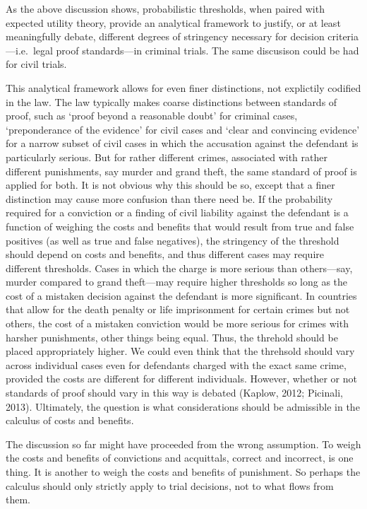 \documentclass[10pt,dvipsnames,enabledeprecatedfontcommands]{scrartcl}
\begin{document}
As the above discussion shows, probabilistic thresholds, when paired
with expected utility theory, provide an analytical framework to
justify, or at least meaningfully debate, different degrees of
stringency necessary for decision criteria---i.e.~legal proof
standards---in criminal trials. The same discusison could be had for
civil trials.

This analytical framework allows for even finer distinctions, not
explictily codified in the law. The law typically makes coarse
distinctions between standards of proof, such as `proof beyond a
reasonable doubt' for criminal cases, `preponderance of the evidence'
for civil cases and `clear and convincing evidence' for a narrow subset
of civil cases in which the accusation against the defendant is
particularly serious. But for rather different crimes, associated with
rather different punishments, say murder and grand theft, the same
standard of proof is applied for both. It is not obvious why this should
be so, except that a finer distinction may cause more confusion than
there need be. If the probability required for a conviction or a finding
of civil liability against the defendant is a function of weighing the
costs and benefits that would result from true and false positives (as
well as true and false negatives), the stringency of the threshold
should depend on costs and benefits, and thus different cases may
require different thresholds. Cases in which the charge is more serious
than others---say, murder compared to grand theft---may require higher
thresholds so long as the cost of a mistaken decision against the
defendant is more significant. In countries that allow for the death
penalty or life imprisonment for certain crimes but not others, the cost
of a mistaken conviction would be more serious for crimes with harsher
punishments, other things being equal. Thus, the threhold should be
placed appropriately higher. We could even think that the threhsold
should vary across individual cases even for defendants charged with the
exact same crime, provided the costs are different for different
individuals. However, whether or not standards of proof should vary in
this way is debated (Kaplow, 2012; Picinali, 2013). Ultimately, the
question is what considerations should be admissible in the calculus of
costs and benefits.

The discussion so far might have proceeded from the wrong assumption. To
weigh the costs and benefits of convictions and acquittals, correct and
incorrect, is one thing. It is another to weigh the costs and benefits
of punishment. So perhaps the calculus should only strictly apply to
trial decisions, not to what flows from them.
\end{document}
